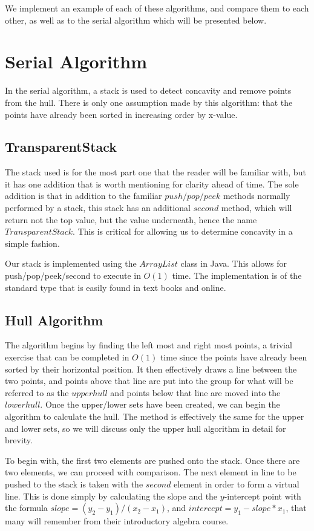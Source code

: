 \documentclass[conference]{IEEEtran}
\begin{document}
We implement an example of each of these algorithms, and compare them to each other, as well as to the serial algorithm which will be presented below.

\section{Serial Algorithm}

In the serial algorithm, a stack is used to detect concavity and remove points from the hull. There is only one assumption made by this algorithm: that the points have already been sorted in increasing order by x-value. 

\subsection{TransparentStack}
The stack used is for the most part one that the reader will be familiar with, but it has one addition that is worth mentioning for clarity ahead of time. The sole addition is that in addition to the familiar $push/pop/peek$ methods normally performed by a stack, this stack has an additional $second$ method, which will return not the top value, but the value underneath, hence the name $TransparentStack$. This is critical for allowing us to determine concavity in a simple fashion.

Our stack is implemented using the $ArrayList$ class in Java. This allows for push/pop/peek/second to execute in $O(1)$ time. The implementation is of the standard type that is easily found in text books and online.

\subsection{Hull Algorithm}
The algorithm begins by finding the left most and right most points, a trivial exercise that can be completed in $O(1)$ time since the points have already been sorted by their horizontal position. It then effectively draws a line between the two points, and points above that line are put into the group for what will be referred to as the $upper hull$ and points below that line are moved into the $lower hull$. Once the upper/lower sets have been created, we can begin the algorithm to calculate the hull. The method is effectively the same for the upper and lower sets, so we will discuss only the upper hull algorithm in detail for brevity.

To begin with, the first two elements are pushed onto the stack. Once there are two elements, we can proceed with comparison. The next element in line to be pushed to the stack is taken with the $second$ element in order to form a virtual line. This is done simply by calculating the slope and the $y$-intercept point with the formula $slope = (y_2 - y_1)/(x_2 - x_1)$, and $intercept = y_1 - slope * x_1$, that many will remember from their introductory algebra course.
\end{document}
